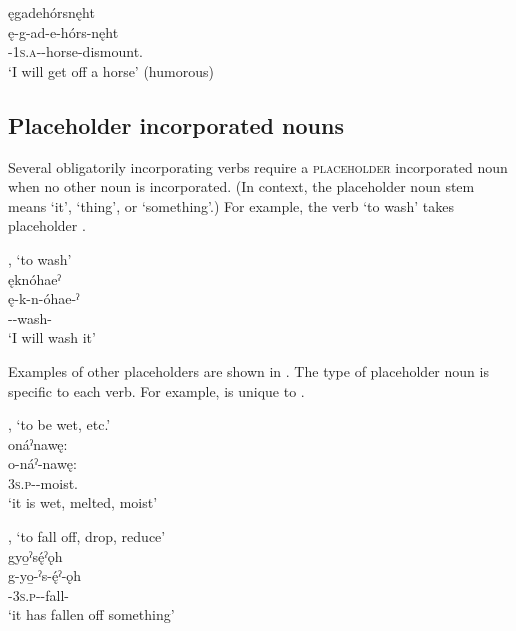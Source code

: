 \ea\label{ex:nounincex302} ęgadehórsnęht \\
\gll ę-g-ad-e-hórs-nęht \\
\fut-\textsc{1s.a}-{\semireflexive}-horse-dismount.{\zeropunctual}\\
\glt ‘I will get off a horse’ (humorous)
\z


\subsection{Placeholder incorporated nouns} \label{ch:Placeholder incorporated nouns}
Several obligatorily incorporating verbs require a \textsc{placeholder} incorporated noun when no other noun is incorporated. (In context, the placeholder noun stem means ‘it’, ‘thing’, or ‘something’.) For example, the verb  ‘to wash’ takes placeholder  .

\ea\label{ex:incverbex9} ,  ‘to wash’\\
ęknóhaeˀ\\
\gll ę-k-n-óhae-ˀ\\
 \fut--wash-{\punctual}\\
\glt `I will wash it'
\z


Examples of other placeholders are shown in . The type of placeholder noun is specific to each verb. For example,  is unique to  .

\ea\label{ex:incverbex10} ,  ‘to be wet, etc.’\\
onáˀnawę:\\
\gll o-náˀ-nawę:\\
 \textsc{3s.p}--moist.{\stative}\\
\glt `it is wet, melted, moist'
\z


\ea\label{ex:incverbex11} ,  ‘to fall off, drop, reduce’\\
gyo̱ˀsę́ˀǫh\\
\gll g-yo̱-ˀs-ę́ˀ-ǫh\\
 {\cislocative}-\textsc{3s.p}--fall-{\stative}\\
\glt `it has fallen off something'
\z



